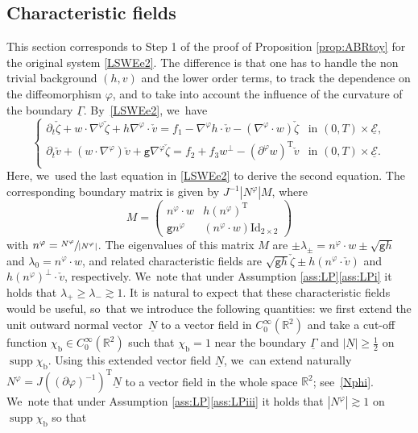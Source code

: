 \documentclass[10pt]{amsart}
\newcommand{\gr}{{\mathtt g}}
\newcommand{\R}{{\mathbb R}}
\newcommand{\dt}{\partial_t}
\newcommand{\cE}{{\mathcal E}}
\newcommand{\ul}[1]{\underline{#1}}
\newcommand{\itGamma}{\mathit{\Gamma}}
\theoremstyle{definition}
\begin{document}
\subsection{Characteristic fields}
This section corresponds to Step 1 of the proof of Proposition \ref{prop:ABRtoy} for the original system \eqref{LSWEe2}.
The difference is that one has to handle the non trivial background $(h,v)$ and the lower order terms, to track the dependence on the diffeomorphism $\varphi$,
and to take into account the influence of the curvature of the boundary $\ul{\itGamma}$. By~\eqref{LSWEe2}, we~have
\begin{equation}\label{LSWEe5}
\begin{cases}
\dt\check{\zeta}+w\cdot\nabla^\varphi\check{\zeta}+h\nabla^\varphi\cdot\check{v} = f_1-\nabla^\varphi h\cdot\check{v}-(\nabla^\varphi\cdot w)\check{\zeta}
&\text{in } (0,T)\times\ul{\cE}, \\
\dt\check{v}+(w\cdot\nabla^\varphi)\check{v}+\gr\nabla^\varphi\check{\zeta} = f_2 + f_3w^\perp-(\partial^\varphi w)^\mathrm{T}\check{v}
&\text{in } (0,T)\times\ul{\cE}. \\
\end{cases}
\end{equation}
Here, we~used the last equation in \eqref{LSWEe2} to derive the second equation.
The corresponding boundary matrix is given by $J^{-1}|N^\varphi| M$, where
\[
M =
\begin{pmatrix}
n^\varphi\cdot w & h(n^\varphi)^\mathrm{T} \\
\gr n^\varphi & (n^\varphi\cdot w)\mathrm{Id}_{2\times2}
\end{pmatrix}
\]
with $n^\varphi = \sfrac{N^\varphi}{|N^\varphi|}$.
The eigenvalues of this matrix $M$ are $\pm\lambda_{\pm}=n^\varphi\cdot w \pm \sqrt{\gr h}$ and $\lambda_0=n^\varphi\cdot w$, and related characteristic fields are
$\sqrt{\gr h}\check{\zeta}\pm h(n^\varphi\cdot\check{v})$ and $h(n^\varphi)^\perp\cdot\check{v}$, respectively. We~note that under Assumption \ref{ass:LP}\eqref{ass:LPi} it holds that $\lambda_+\geq\lambda_-\gtrsim1$.
It is natural to expect that these characteristic fields would be useful, so~that we introduce the following quantities:
we first extend the unit outward normal vector~$\ul{N}$ to a vector field in $C_0^\infty(\R^2)$ and take a cut-off function $\chi_\mathrm{b}\in C_0^\infty(\R^2)$
such that $\chi_\mathrm{b}=1$ near the boundary $\ul{\itGamma}$ and $|\ul{N}|\geq\frac12$ on $\operatorname{supp}\chi_\mathrm{b}$.
Using this extended vector field $\ul{N}$, we~can extend naturally $N^\varphi=J((\partial\varphi)^{-1})^\mathrm{T}\ul{N}$ to a vector field in the whole space $\R^2$; see~\eqref{Nphi}. We~note that under Assumption \ref{ass:LP}\eqref{ass:LPiii} it holds that $|N^\varphi| \gtrsim 1$ on $\operatorname{supp}\chi_\mathrm{b}$ so that
\end{document}
